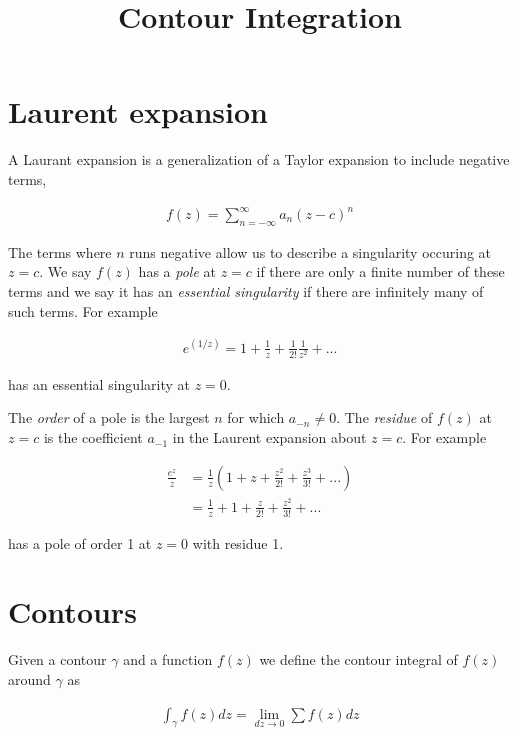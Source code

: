 \documentclass{article}
\title{Contour Integration}
\date{}
\begin{document}
\maketitle

\section{Laurent expansion}

A Laurant expansion is a generalization of a Taylor expansion to include negative terms, 

\begin{align}
f(z) = \displaystyle\sum\limits_{n=-\infty}^{\infty} a_n(z-c)^n
\end{align}

The terms where $n$ runs negative allow us to describe a singularity occuring at $z=c$. We say $f(z)$ has a \emph{pole} at $z=c$ if there are only a finite number of these terms and we say it has an \emph{essential singularity} if there are infinitely many of such terms. For example

\begin{align}
e^{(1/z)} = 1 + \frac{1}{z} + \frac{1}{2!}\frac{1}{z^2} + ...
\end{align}

has an essential singularity at $z=0$.

The \emph{order} of a pole is the largest $n$ for which $a_{-n} \neq 0$. The \emph{residue} of $f(z)$ at $z=c$ is the coefficient $a_{-1}$ in the Laurent expansion about $z=c$. For example

\begin{align}
\frac{e^z}{z} &= \frac{1}{z}\left(1 + z + \frac{z^2}{2!} + \frac{z^3}{3!} + ...\right) \\
                &= \frac{1}{z} + 1 + \frac{z}{2!} + \frac{z^2}{3!} + ...
\end{align}

has a pole of order 1 at $z=0$ with residue 1.

\section{Contours}

Given a contour $\gamma$ and a function $f(z)$ we define the contour integral of $f(z)$ around $\gamma$ as

\begin{align}
\int_\gamma f(z) dz = \lim_{dz \rightarrow 0}\sum f(z) dz
\end{align}
\end{document}
